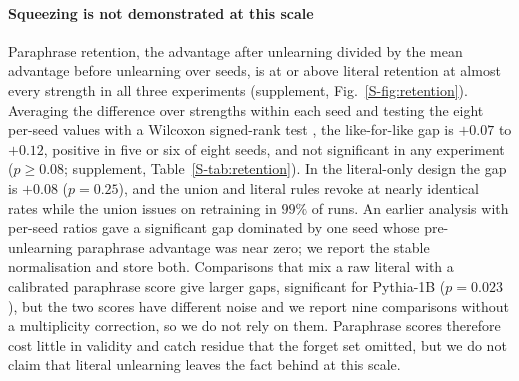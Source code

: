 \paragraph{Squeezing is not demonstrated at this scale} Paraphrase retention, the advantage
after unlearning divided by the mean advantage before unlearning over seeds, is at or above
literal retention at almost every strength in all three experiments
(supplement, Fig.~\ref{S-fig:retention}). Averaging the difference over strengths within each seed and
testing the eight per-seed values with a Wilcoxon signed-rank test \citep{wilcoxon1945}, the
like-for-like gap is $+0.07$ to $+0.12$, positive in five or six of eight seeds, and not
significant in any experiment ($p\ge0.08$; supplement, Table~\ref{S-tab:retention}). In the
literal-only design the gap is $+0.08$ ($p=0.25$), and the union and literal rules revoke at
nearly identical rates while the union issues on retraining in $99\%$ of runs. An earlier
analysis with per-seed ratios gave a significant gap dominated by one seed whose
pre-unlearning paraphrase advantage was near zero; we report the stable normalisation and
store both. Comparisons that mix a raw literal with a calibrated paraphrase score give larger
gaps, significant for Pythia-1B ($p=0.023$), but the two scores have different noise and we
report nine comparisons without a multiplicity correction, so we do not rely on them.
Paraphrase scores therefore cost little in validity and catch residue that the
forget set omitted, but we do not claim that literal unlearning leaves the fact behind at
this scale.


